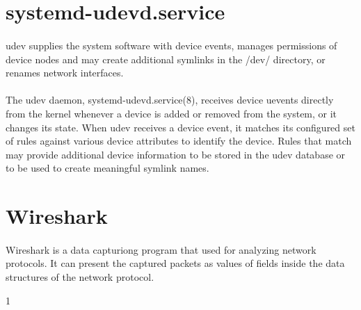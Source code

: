\documentclass[mscthesis]{usiinfthesis}
\begin{document}
\section{systemd-udevd.service}\label{sec:systemd-udevd.service}
\paragraph{}
udev supplies the system software with device events, manages permissions of device nodes and may create additional symlinks in the /dev/ directory, or renames network interfaces.
\paragraph{}
The udev daemon, systemd-udevd.service(8), receives device uevents directly from the kernel whenever a device is added or removed from the system, or it changes its state. When udev receives a device event, it matches its configured set of rules against various device attributes to identify the device. Rules that match may provide additional device information to be stored in the udev database or to be used to create meaningful symlink names.

\section{Wireshark}\label{sec:Wireshark}
\paragraph{}
Wireshark is a data capturiong program that used for analyzing network protocols. It can present the captured packets as values of fields inside the data structures of the network protocol.

%
%



1
\end{document}
